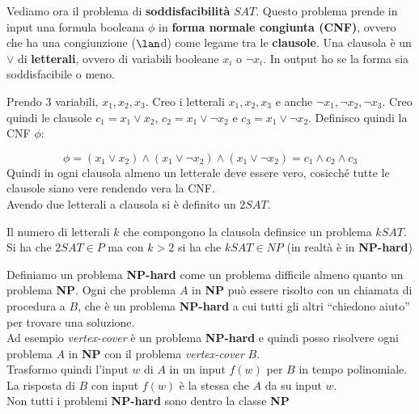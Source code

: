 \documentclass[a4paper,12pt, oneside]{book}
\begin{document}
\begin{definizione}
  Vediamo ora il problema di \textbf{soddisfacibilità} $SAT$. Questo problema
  prende in input una formula booleana $\phi$ in \textbf{forma normale congiunta
    (CNF)}, ovvero che ha una congiunzione ($\lan$d) come legame tra le
  \textbf{clausole}. Una clausola è un $\lor$ di \textbf{letterali}, ovvero di
  variabili booleane $x_i$ o $\neg x_i$. In output ho se la forma sia
  soddisfacibile o meno. 
  \begin{esempio}
    Prendo 3 variabili, $x_1,x_2,x_3$. Creo i letterali  $x_1,x_2,x_3$ e anche
    $\neg x_1,\neg x_2,\neg x_3$. Creo quindi le clausole $c_1=x_1\lor x_2$,
    $c_2=x_1\lor \neg x_2$ e $c_3=x_1\lor \neg x_2$. Definisco quindi la CNF
    $\phi$:
    
    \[\phi=(x_1\lor x_2)\land (x_1\lor \neg x_2)\land
      (x_1\lor \neg x_2)=c_1\land c_2\land c_3\]
    Quindi in ogni clausola almeno un letterale deve essere vero, cosicché tutte
    le clausole siano vere rendendo vera la CNF.\\
    Avendo due letterali a clausola si è definito un $2SAT$.
  \end{esempio}
  Il numero di letterali $k$ che compongono la clausola definsice un problema
  $kSAT$. Si ha che $2SAT\in P$ ma con $k>2$ si ha che $kSAT\in NP$ (in
  realtà è in \textbf{NP-hard})
\end{definizione}
\begin{definizione}
  Definiamo un problema \textbf{NP-hard} come un problema difficile almeno
  quanto un problema \textbf{NP}. Ogni che problema $A$ in \textbf{NP} può
  essere risolto con un chiamata di procedura a $B$, che è un problema
  \textbf{NP-hard} a cui tutti gli altri ``chiedono aiuto'' per trovare una
  soluzione. \\
  Ad esempio \textit{vertex-cover} è un problema \textbf{NP-hard} e quindi posso
  risolvere ogni problema $A$ in \textbf{NP} con il problema
  \textit{vertex-cover} $B$.\\
  Trasformo quindi l'input $w$ di $A$ in un input
  $f(w)$ per $B$ in tempo polinomiale. La risposta di $B$ con input $f(w)$ è la
  stessa che $A$ da su input $w$.\\
  Non tutti i problemi \textbf{NP-hard} sono dentro la classe \textbf{NP}
\end{definizione}
\end{document}
